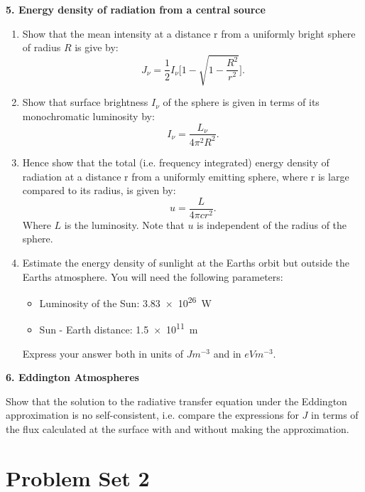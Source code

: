\documentclass{article}
\begin{document}
	\textbf{5. Energy density of radiation from a central source}
		\begin{enumerate}[label=(\alph*)]
			\item Show that the mean intensity at a distance r from a uniformly bright sphere of radius $R$ is give by:
			\begin{equation}
				J_{\nu}=\frac{1}{2} I_{\nu} \Bigg[1 - \sqrt{1-\frac{R^{2}}{r^{2}}}\Bigg].
			\end{equation}
			\item Show that surface brightness $I_{\nu}$ of the sphere is given in terms of its monochromatic luminosity by:
			\begin{equation}
				I_{\nu}= \frac{L_{\nu}}{4\pi^{2}R^{2}}.
			\end{equation}
			\item Hence show that the total (i.e. frequency integrated) energy density of radiation at a distance r from a uniformly emitting sphere, where r is large compared to its radius, is given by: 
			\begin{equation}
				u=\frac{L}{4\pi c r^2}.
			\end{equation}
			Where $L$ is the luminosity. Note that $u$ is independent of the radius of the sphere. 
			\item  Estimate the energy density of sunlight at the Earths orbit but outside the Earths atmosphere. You will need the following parameters:
			\begin{itemize}
				\item Luminosity of the Sun: \SI{3.83e26}{\watt}
				\item Sun - Earth distance: \SI{1.5e11}{\meter}
			\end{itemize}
			Express your answer both in units of $J m^{-3}$ and in $eV m^{-3}$.
		\end{enumerate}
	

	
	\textbf{6. Eddington Atmospheres}

		\noindent
		Show that the solution to the radiative transfer equation under the Eddington approximation is no self-consistent, i.e. compare the expressions for $J$ in terms of the flux calculated at the surface with and without making the approximation. 
	
\newpage %
\section{Problem Set 2}
	
\end{document}
